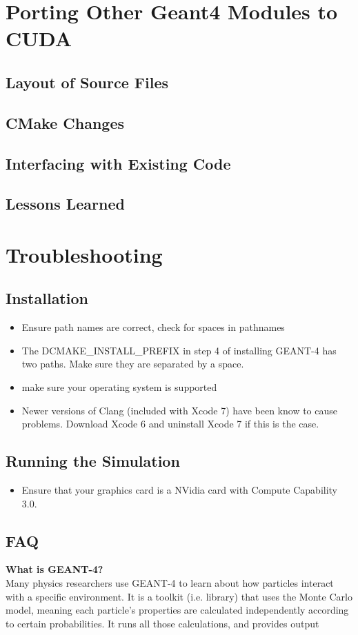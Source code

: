 \documentclass[12pt]{article}
\begin{document}
\section{Porting Other Geant4 Modules to CUDA} %
\subsection{Layout of Source Files} %
\subsection{CMake Changes} %
\subsection{Interfacing with Existing Code} %
\subsection{Lessons Learned} %

\section{Troubleshooting} %
\subsection{Installation} %
\begin{itemize}
\item Ensure path names are correct, check for spaces in pathnames
\item The DCMAKE\_INSTALL\_PREFIX in step 4 of installing GEANT-4  has two paths. Make sure they are separated by a space.
\item make sure your operating system is supported 
\item Newer versions of Clang (included with Xcode 7) have been know to cause problems. Download Xcode 6 and uninstall Xcode 7 if this is the case.
\end{itemize}
\subsection{Running the Simulation} %
\begin{itemize}
\item Ensure that your graphics card is a NVidia card with Compute Capability 3.0.
\end{itemize}
\subsection{FAQ} %
\textbf{What is GEANT-4?}\\
Many physics researchers use GEANT-4 to learn about how particles interact with a specific environment. It is a toolkit (i.e. library) that uses the Monte Carlo model, meaning each particle's properties are calculated independently according to certain probabilities. It runs all those calculations, and provides output\\
\end{document}
